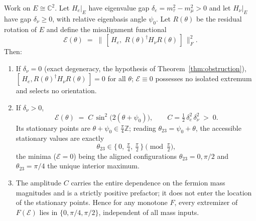 \begin{theorem}
\label{thm:nogo}
Work on $E\cong\mathbb{C}^2$. Let $H_e|_E$ have eigenvalue gap
$\delta_e=m_\tau^2-m_\mu^2>0$ and let $H_\nu|_E$ have gap $\delta_\nu\ge0$, with
relative eigenbasis angle $\psi_0$. Let $R(\theta)$ be the residual rotation of
$E$ and define the misalignment functional
\[
  \mathcal{E}(\theta)\;=\;\bigl\|\,[\,H_e,\;R(\theta)^\dagger H_\nu R(\theta)\,]\,\bigr\|_F^2 .
\]
Then:
\begin{enumerate}
\item[(i)] If $\delta_\nu=0$ (exact degeneracy, the hypothesis of
Theorem~\ref{thm:obstruction}), $[\,H_e,R(\theta)^\dagger H_\nu R(\theta)\,]=0$
for all $\theta$; $\mathcal E\equiv0$ possesses no isolated extremum and selects
no orientation.
\item[(ii)] If $\delta_\nu>0$,
\[
  \boxed{\;\mathcal{E}(\theta)\;=\;C\,\sin^2\!\bigl(2(\theta+\psi_0)\bigr),
  \qquad C=\tfrac12\,\delta_e^2\,\delta_\nu^2\;>\;0. \;}
\]
Its stationary points are $\theta+\psi_0\in\tfrac{\pi}{4}\mathbb{Z}$; reading
$\theta_{23}=\psi_0+\theta$, the accessible stationary values are exactly
\[
  \theta_{23}\in\{\,0,\ \tfrac{\pi}{4},\ \tfrac{\pi}{2}\,\}\pmod{\tfrac{\pi}{2}},
\]
the minima ($\mathcal E=0$) being the aligned configurations $\theta_{23}=0,\pi/2$
and $\theta_{23}=\pi/4$ the unique interior maximum.
\item[(iii)] The amplitude $C$ carries the entire dependence on the fermion
mass magnitudes and is a strictly positive prefactor; it does not enter the
location of the stationary points. Hence for any monotone $F$, every extremizer
of $F(\mathcal E)$ lies in $\{0,\pi/4,\pi/2\}$, independent of all mass inputs.
\end{enumerate}
\end{theorem}


